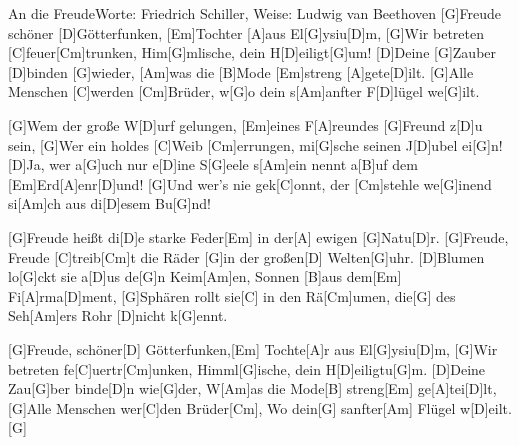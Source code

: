 \documentclass[../main.tex]{subfiles}
\begin{document}
\begin{song}{An die Freude}{Worte: Friedrich Schiller, Weise: Ludwig van Beethoven}{}
[G]Freude schöner [D]Götterfunken, [Em]Tochter [A]aus El[G]ysiu[D]m,
[G]Wir betreten [C]feuer[Cm]trunken, Him[G]mlische, dein H[D]eiligt[G]um!
[D]Deine [G]Zauber [D]binden [G]wieder, [Am]was die [B]Mode [Em]streng [A]gete[D]ilt.
[G]Alle Menschen [C]werden [Cm]Brüder, w[G]o dein s[Am]anfter F[D]lügel we[G]ilt.

[G]Wem der große W[D]urf gelungen, [Em]eines F[A]reundes [G]Freund z[D]u sein,
[G]Wer ein holdes [C]Weib [Cm]errungen, mi[G]sche seinen J[D]ubel ei[G]n!
[D]Ja, wer a[G]uch nur e[D]ine S[G]eele s[Am]ein nennt a[B]uf dem [Em]Erd[A]enr[D]und!
[G]Und wer's nie gek[C]onnt, der [Cm]stehle we[G]inend si[Am]ch aus di[D]esem Bu[G]nd!

[G]Freude heißt di[D]e starke Feder[Em] in der[A] ewigen [G]Natu[D]r.
[G]Freude, Freude [C]treib[Cm]t die Räder [G]in der großen[D] Welten[G]uhr.
[D]Blumen lo[G]ckt sie a[D]us de[G]n Keim[Am]en, Sonnen [B]aus dem[Em] Fi[A]rma[D]ment,
[G]Sphären rollt sie[C] in den Rä[Cm]umen, die[G] des Seh[Am]ers Rohr [D]nicht k[G]ennt.

[G]Freude, schöner[D] Götterfunken,[Em] Tochte[A]r aus El[G]ysiu[D]m,
[G]Wir betreten fe[C]uertr[Cm]unken, Himml[G]ische, dein H[D]eiligtu[G]m.
[D]Deine Zau[G]ber binde[D]n wie[G]der, W[Am]as die Mode[B] streng[Em] ge[A]tei[D]lt,
[G]Alle Menschen wer[C]den Brüder[Cm], Wo dein[G] sanfter[Am] Flügel w[D]eilt.[G]{\hh}
\end{song}
\end{document}

